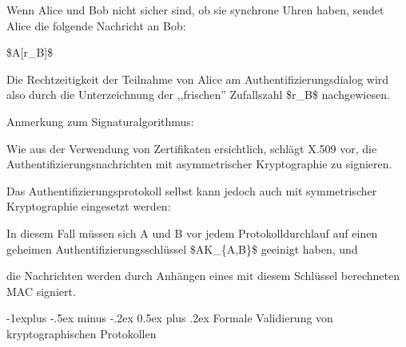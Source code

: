 \documentclass[a4paper]{article}
\makeatletter
\renewcommand{\subsection}{\@startsection{subsection}{2}{0mm}%
 {-1explus -.5ex minus -.2ex}%
 {0.5ex plus .2ex}%
 {\normalfont\normalsize\bfseries}}
\makeatother
\begin{document}
\begin{multicols}{3}
\begin{itemize*}
\begin{itemize*}
                  \item Wenn Alice und Bob nicht sicher sind, ob sie synchrone Uhren haben, sendet Alice die folgende Nachricht an Bob:
            \end{itemize*}
            \begin{enumerate*}
                  \def\labelenumi{\arabic{enumi}.}
                  \setcounter{enumi}{2}
                  \item \$A{[}r\_B{]}\$
            \end{enumerate*}
            \begin{itemize*}
                  \item Die Rechtzeitigkeit der Teilnahme von Alice am Authentifizierungsdialog wird also durch die Unterzeichnung der ,,frischen'' Zufallszahl \$r\_B\$ nachgewiesen.
            \end{itemize*}
            \item Anmerkung zum Signaturalgorithmus:
            \begin{itemize*}
                  \item Wie aus der Verwendung von Zertifikaten ersichtlich, schlägt X.509 vor, die Authentifizierungsnachrichten mit asymmetrischer Kryptographie zu signieren.
                  \item Das Authentifizierungsprotokoll selbst kann jedoch auch mit symmetrischer Kryptographie eingesetzt werden:
                  \begin{itemize*} \item In diesem Fall müssen sich A und B vor jedem Protokolldurchlauf auf einen geheimen Authentifizierungsschlüssel \$AK\_\{A,B\}\$ geeinigt haben, und \item die Nachrichten werden durch Anhängen eines mit diesem Schlüssel berechneten MAC signiert. \end{itemize*}
            \end{itemize*}
      \end{itemize*}


      \subsection{Formale Validierung von kryptographischen
            Protokollen}


\end{multicols}
\end{document}
